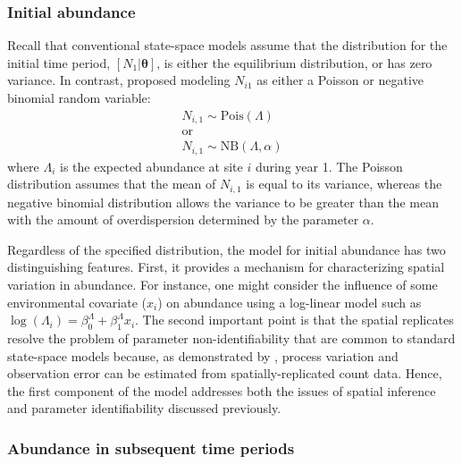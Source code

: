 \documentclass[12pt]{article}
\begin{document}
\subsubsection{Initial abundance}

Recall that conventional state-space models assume that the
distribution for the initial time period,
$[N_1 | \bm{\theta}]$, is either the equilibrium
distribution, or has zero variance.
In contrast, \citet{dail_madsen:2011} proposed modeling $N_{i1}$
as either a Poisson or negative binomial random variable:
\begin{gather}
N_{i,1} \sim \mathrm{Pois}(\Lambda) \nonumber \\
\text{or} \nonumber \\
N_{i,1} \sim \mathrm{NB}(\Lambda, \alpha)
\label{eq:N1}
\end{gather}
where $\Lambda_i$ is the expected abundance at site $i$ during
year 1.
The Poisson distribution assumes that the mean of $N_{i,1}$ is
equal to its variance, whereas the negative binomial distribution allows the
variance to be greater than the mean with the amount of
overdispersion determined by the parameter $\alpha$.

Regardless of the specified distribution, the model for initial
abundance has two distinguishing features. First, it provides a
mechanism for characterizing spatial variation in abundance. For
instance, one might consider the influence of some environmental
covariate ($x_i$) on abundance using a log-linear
model such as $\log(\Lambda_i) = \beta^{\Lambda}_0 +
\beta^{\Lambda}_1
x_{i}$. The second important point is that the spatial
replicates resolve the
problem of parameter non-identifiability that are common to
standard state-space models because, as demonstrated by
\citet{royle:2004biom},
process variation and observation error can be estimated from
spatially-replicated count data. Hence, the first component of
the model addresses both the issues of spatial inference and
parameter identifiability discussed previously.

\subsubsection{Abundance in subsequent time periods}
\end{document}
